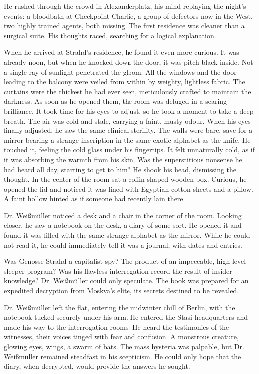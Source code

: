 He rushed through the crowd in Alexanderplatz, his mind replaying the night's events: a bloodbath at Checkpoint Charlie, a group of defectors now in the West, two highly trained agents, both missing.
The first residence was cleaner than a surgical suite.
His thoughts raced, searching for a logical explanation.

When he arrived at Strahd's residence, he found it even more curious.
It was already noon, but when he knocked down the door, it was pitch black inside.
Not a single ray of sunlight penetrated the gloom.
All the windows and the door leading to the balcony were veiled from within by weighty, lightless fabric.
The curtains were the thickest he had ever seen, meticulously crafted to maintain the darkness.
As soon as he opened them, the room was deluged in a searing brilliance.
It took time for his eyes to adjust, so he took a moment to take a deep breath.
The air was cold and stale, carrying a faint, musty odour.
When his eyes finally adjusted, he saw the same clinical sterility.
The walls were bare, save for a mirror bearing a strange inscription in the same exotic alphabet as the knife.
He touched it, feeling the cold glass under his fingertips.
It felt unnaturally cold, as if it was absorbing the warmth from his skin.
Was the superstitious nonsense he had heard all day, starting to get to him?
He shook his head, dismissing the thought.
In the center of the room sat a coffin-shaped wooden box.
Curious, he opened the lid and noticed it was lined with Egyptian cotton sheets and a pillow.
A faint hollow hinted as if someone had recently lain there.

Dr. Weißmüller noticed a desk and a chair in the corner of the room.
Looking closer, he saw a notebook on the desk, a diary of some sort.
He opened it and found it was filled with the same strange alphabet as the mirror.
While he could not read it, he could immediately tell it was a journal, with dates and entries.

Was Genosse Strahd a capitalist spy?
The product of an impeccable, high-level sleeper program?
Was his flawless interrogation record the result of insider knowledge?
Dr. Weißmüller could only speculate.
The book was prepared for an expedited decryption from Moskva's elite, its secrets destined to be revealed.

Dr. Weißmüller left the flat, entering the midwinter chill of Berlin, with the notebook tucked securely under his arm.
He entered the Stasi headquarters and made his way to the interrogation rooms.
He heard the testimonies of the witnesses, their voices tinged with fear and confusion.
A monstrous creature, glowing eyes, wings, a swarm of bats.
The mass hysteria was palpable, but Dr. Weißmüller remained steadfast in his scepticism.
He could only hope that the diary, when decrypted, would provide the answers he sought.
